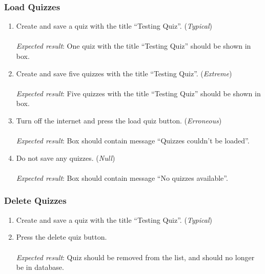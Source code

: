 \subsubsection{Load Quizzes} %
\label{ssub:load_quizzes}
\begin{enumerate}[leftmargin=*]
\item Create and save a quiz with the title ``Testing Quiz''. (\textit{Typical})\\\\
\textit{Expected result}: One quiz with the title ``Testing Quiz'' should be shown in box.\\
\item Create and save five quizzes with the title ``Testing Quiz''. (\textit{Extreme})\\\\
\textit{Expected result}: Five quizzes with the title ``Testing Quiz'' should be shown in box.\\
\item Turn off the internet and press the load quiz button. (\textit{Erroneous})\\\\
\textit{Expected result}: Box should contain message ``Quizzes couldn't be loaded''.\\
\item Do not save any quizzes. (\textit{Null})\\\\
\textit{Expected result}: Box should contain message ``No quizzes available''.
\end{enumerate}

\subsubsection{Delete Quizzes} %
\label{ssub:delete_quizzes}
\begin{enumerate}[leftmargin=*]
\item Create and save a quiz with the title ``Testing Quiz''. (\textit{Typical})
\item Press the delete quiz button.\\\\
\textit{Expected result}: Quiz should be removed from the list, and should no longer be in database.
\end{enumerate}

